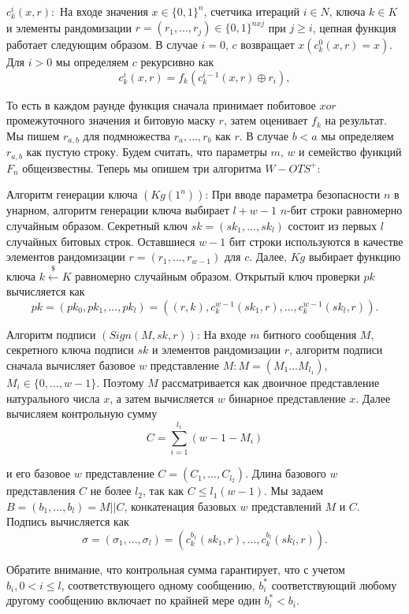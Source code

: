 \documentclass[a4paper, 14pt]{extarticle}
\begin{document}
$c^{i}_{k}(x, r):$ На входе значения $x \in \{0, 1\}^{n}$, счетчика итераций $i \in N$, ключа $k \in K$ и элементы рандомизации $r = (r_{1}, ..., r_{j}) \in \{0, 1\}^{nxj}$ при $j \geq i$, цепная функция работает следующим образом. В случае $i = 0$, $c$ возвращает $x(c^{0}_{k}(x, r) = x)$. Для $i > 0$ мы определяем $c$ рекурсивно как
\[ c^{i}_{k}(x, r) = f_{k}(c^{i - 1}_{k}(x, r) \oplus r_{i}) ,\]

То есть в каждом раунде функция сначала принимает побитовое $xor$ промежуточного значения и битовую маску $r$, затем оценивает $f_{k}$ на результат. Мы пишем $r_{a,b}$ для подмножества $r_{a}, ..., r_{b}$ как $r$. В случае $b < a$ мы определяем $r_{a,b}$ как пустую строку. Будем считать, что параметры $m$, $w$ и семейство функций $F_{n}$ общеизвестны. Теперь мы опишем три алгоритма $W-OTS^{+}$:

Алгоритм генерации ключа $(Kg(1^n))$: При вводе параметра безопасности $n$ в унарном, алгоритм генерации ключа выбирает $l + w - 1$ $n$-бит строки равномерно случайным образом. Секретный ключ $sk = (sk_{1}, ..., sk_{l})$ состоит из первых $l$ случайных битовых строк. Оставшиеся $w - 1$ бит строки используются в качестве элементов рандомизации $r = (r_{1}, ..., r_{w - 1})$ для $c$. Далее, $Kg$ выбирает функцию ключа $k \stackrel{\$}\leftarrow K$ равномерно случайным образом. Открытый ключ проверки $pk$ вычисляется как
\[ pk = (pk_{0}, pk_{1}, ..., pk_{l}) = ((r, k),c^{w - 1}_{k}(sk_{1},r), ..., c^{w - 1}_{k}(sk_{l}, r)). \]

Алгоритм подписи $(Sign(M, sk, r))$: На входе $m$ битного сообщения $M$, секретного ключа подписи $sk$ и элементов рандомизации $r$, алгоритм подписи сначала вычисляет базовое $w$ представление $M: M = (M_{1} . . . M_{l_{1}} )$, $M_{i} \in \{0, ..., w - 1\}$. Поэтому $M$ рассматривается как двоичное представление натурального числа $x$, а затем вычисляется $w$ бинарное представление $x$. Далее вычисляем контрольную сумму
\[ C = \sum^{l_{1}}_{i = 1}(w - 1 - M_{i}) \]

и его базовое $w$ представление $C = (C_{1}, ..., C_{l_{2}})$. Длина базового $w$ представления $C$ не более $l_{2}$, так как $C \leq l_{1}(w - 1)$. Мы задаем $B = (b_{1}, ..., b_{l}) = M || C$, конкатенация базовых $w$ представлений $M$ и $C$. Подпись вычисляется как
\[ \sigma = (\sigma_{1}, ..., \sigma_{l}) = (c^{b_{1}}_{k}(sk_{1},r), ..., c^{b_{l}}_{k}(sk_{l},r)). \]

Обратите внимание, что контрольная сумма гарантирует, что с учетом \newline
$b_{i}, 0 < i \leq l$, соответствующего одному сообщению, $b^{*}_{i}$ соответствующий любому другому сообщению включает по крайней мере один $b^{*}_{i} < b_{i}$.
\end{document}
